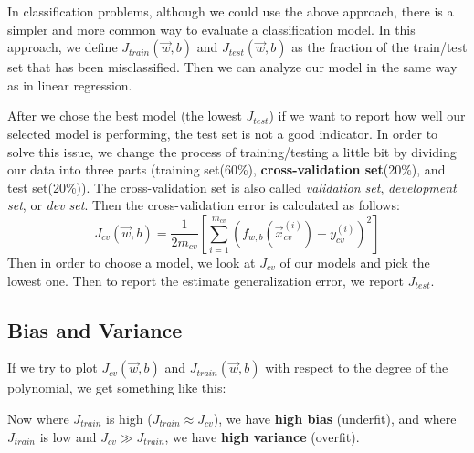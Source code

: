 \documentclass[a4paper, 12pt]{book}
\begin{document}
In classification problems, although we could use the above approach, there is a simpler and more common way to evaluate a classification model. In this approach, we define $J_{train}(\Vec{w},b)$ and $J_{test}(\Vec{w},b)$ as the fraction of the train/test set that has been misclassified. Then we can analyze our model in the same way as in linear regression.

After we chose the best model (the lowest $J_{test}$) if we want to report how well our selected model is performing, the test set is not a good indicator. In order to solve this issue, we change the process of training/testing a little bit by dividing our data into three parts (training set(60\%), \textbf{cross-validation set}(20\%), and test set(20\%)). The cross-validation set is also called \emph{validation set}, \emph{development set}, or \emph{dev set}. Then the cross-validation error is calculated as follows:
\[J_{cv}(\Vec{w}, b) = \frac{1}{2m_{cv}} \left[ \sum_{i=1}^{m_{cv}} (f_{w,b}(\Vec{x}_{cv}^{(i)}) - y_{cv}^{(i)})^2\right]\]
Then in order to choose a model, we look at $J_{cv}$ of our models and pick the lowest one. Then to report the estimate generalization error, we report $J_{test}$.
\newpage
\subsection{Bias and Variance}
If we try to plot $J_{cv}(\Vec{w},b)$ and $J_{train}(\Vec{w},b)$ with respect to the degree of the polynomial, we get something like this:
\begin{center}
\end{center}
Now where $J_{train}$ is high ($J_{train} \approx J_{cv}$), we have \textbf{high bias} (underfit), and where $J_{train}$ is low and $J_{cv} \gg J_{train}$, we have \textbf{high variance} (overfit).
\end{document}
